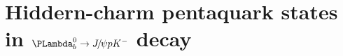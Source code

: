 
\chapter{Hiddern-charm pentaquark states in $\Lb\to\jpsi\proton\Km$ decay}
\label{app:pentaquark_jpsipk}
%






